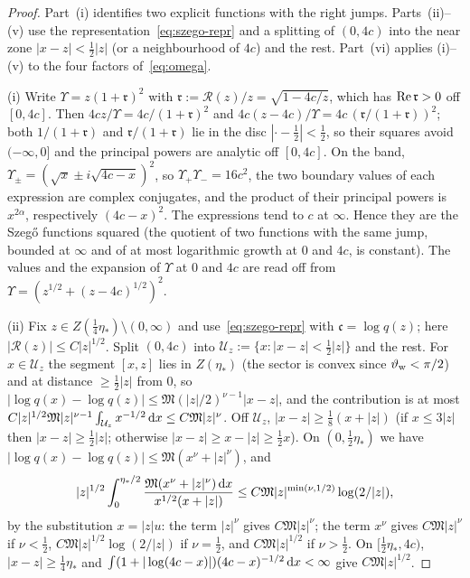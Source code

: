 \begin{proof}
Part~(i) identifies two explicit functions with the right jumps. Parts~(ii)--(v) use the
representation~\eqref{eq:szego-repr} and a splitting of $(0,4c)$ into the near zone $|x-z|<\frac12|z|$ (or a
neighbourhood of $4c$) and the rest. Part~(vi) applies (i)--(v) to the four factors of~\eqref{eq:omega}.

(i) Write $\Upsilon=z(1+\mathfrak r)^2$ with $\mathfrak r:=\mathcal R(z)/z=\sqrt{1-4c/z}$, which has $\operatorname{Re}\mathfrak r>0$
off $[0,4c]$. Then $4cz/\Upsilon=4c/(1+\mathfrak r)^2$ and $4c(z-4c)/\Upsilon=4c\,(\mathfrak r/(1+\mathfrak r))^2$;
both $1/(1+\mathfrak r)$ and $\mathfrak r/(1+\mathfrak r)$ lie in the disc $|\cdot-\frac12|<\frac12$, so their squares
avoid $(-\infty,0]$ and the principal powers are analytic off $[0,4c]$. On the band,
$\Upsilon_\pm=(\sqrt x\pm i\sqrt{4c-x})^2$, so $\Upsilon_+\Upsilon_-=16c^2$, the two boundary values of each expression
are complex conjugates, and the product of their principal powers is $x^{2\alpha}$, respectively $(4c-x)^2$. The
expressions tend to $c$ at $\infty$. Hence they are the Szeg\H{o} functions squared (the quotient of two functions with
the same jump, bounded at $\infty$ and of at most logarithmic growth at $0$ and $4c$, is constant). The values and the
expansion of $\Upsilon$ at $0$ and $4c$ are read off from $\Upsilon=(z^{1/2}+(z-4c)^{1/2})^2$.

(ii) Fix $z\in Z(\frac14\eta_*)\setminus(0,\infty)$ and use~\eqref{eq:szego-repr} with $\mathfrak c=\log q(z)$; here
$|\mathcal R(z)|\le C|z|^{1/2}$. Split $(0,4c)$ into $\mathcal U_z:=\{x:|x-z|<\frac12|z|\}$ and the rest. For
$x\in\mathcal U_z$ the segment $[x,z]$ lies in $Z(\eta_*)$ (the sector is convex since $\vartheta_{\mathrm{w}}<\pi/2$) and at distance
$\ge\frac12|z|$ from $0$, so $|\log q(x)-\log q(z)|\le\mathfrak M(|z|/2)^{\nu-1}|x-z|$, and the contribution is at most
$C|z|^{1/2}\mathfrak M|z|^{\nu-1}\int_{\mathcal U_z}x^{-1/2}\,\mathrm{d} x\le C\mathfrak M|z|^\nu$. Off $\mathcal U_z$,
$|x-z|\ge\frac18(x+|z|)$ (if $x\le3|z|$ then $|x-z|\ge\frac12|z|$; otherwise $|x-z|\ge x-|z|\ge\frac12x$). On
$(0,\frac12\eta_*)$ we have $|\log q(x)-\log q(z)|\le\mathfrak M(x^\nu+|z|^\nu)$, and
\[
  |z|^{1/2}\int_0^{\eta_*/2}\frac{\mathfrak M(x^\nu+|z|^\nu)\,\mathrm{d} x}{x^{1/2}(x+|z|)}\le C\mathfrak M|z|^{\min(\nu,1/2)}\log(2/|z|),
\]
by the substitution $x=|z|u$: the term $|z|^\nu$ gives $C\mathfrak M|z|^\nu$; the term $x^\nu$ gives $C\mathfrak
M|z|^\nu$ if $\nu<\frac12$, $C\mathfrak M|z|^{1/2}\log(2/|z|)$ if $\nu=\frac12$, and $C\mathfrak M|z|^{1/2}$ if
$\nu>\frac12$. On $[\frac12\eta_*,4c)$, $|x-z|\ge\frac14\eta_*$ and
$\int(1+|\log(4c-x)|)(4c-x)^{-1/2}\,\mathrm{d} x<\infty$ give $C\mathfrak M|z|^{1/2}$.


\end{proof}

